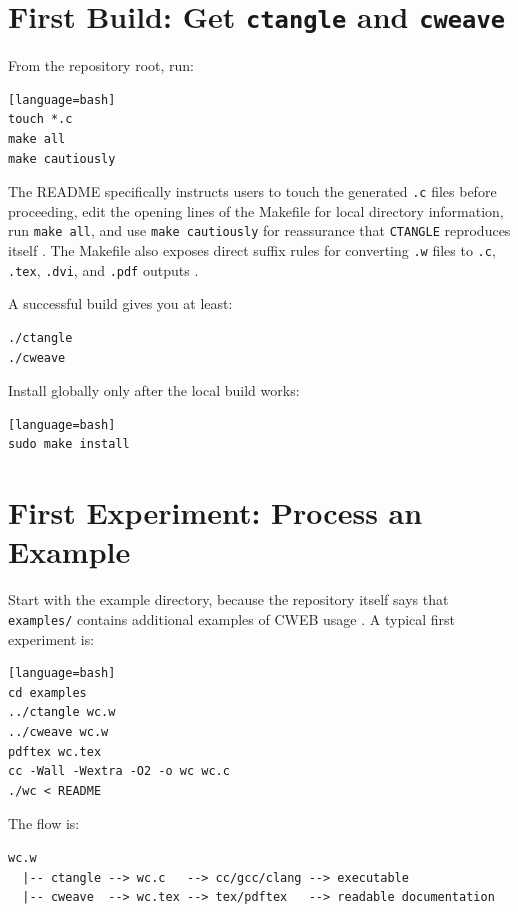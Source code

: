 \documentclass[11pt]{article}
\begin{document}
\section{First Build: Get \texttt{ctangle} and \texttt{cweave}}

From the repository root, run:

\begin{verbatim}[language=bash]
touch *.c
make all
make cautiously
\end{verbatim}

The README specifically instructs users to touch the generated \texttt{.c} files before proceeding, edit the opening lines of the Makefile for local directory information, run \texttt{make all}, and use \texttt{make cautiously} for reassurance that \texttt{CTANGLE} reproduces itself \cite{repo-readme}. The Makefile also exposes direct suffix rules for converting \texttt{.w} files to \texttt{.c}, \texttt{.tex}, \texttt{.dvi}, and \texttt{.pdf} outputs \cite{repo-makefile}.

A successful build gives you at least:

\begin{verbatim}
./ctangle
./cweave
\end{verbatim}

Install globally only after the local build works:

\begin{verbatim}[language=bash]
sudo make install
\end{verbatim}

\section{First Experiment: Process an Example}

Start with the example directory, because the repository itself says that \texttt{examples/} contains additional examples of CWEB usage \cite{repo-readme}. A typical first experiment is:

\begin{verbatim}[language=bash]
cd examples
../ctangle wc.w
../cweave wc.w
pdftex wc.tex
cc -Wall -Wextra -O2 -o wc wc.c
./wc < README
\end{verbatim}

The flow is:

\begin{verbatim}
wc.w
  |-- ctangle --> wc.c   --> cc/gcc/clang --> executable
  |-- cweave  --> wc.tex --> tex/pdftex   --> readable documentation
\end{verbatim}
\end{document}
